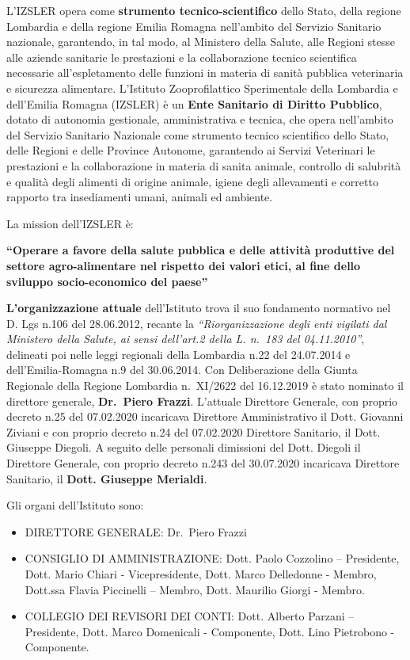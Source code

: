 \documentclass[
  12pt,
]{article}
\begin{document}
L'IZSLER opera come \textbf{strumento tecnico-scientifico} dello Stato,
della regione Lombardia e della regione Emilia Romagna nell'ambito del
Servizio Sanitario nazionale, garantendo, in tal modo, al Ministero
della Salute, alle Regioni stesse alle aziende sanitarie le prestazioni
e la collaborazione tecnico scientifica necessarie all'espletamento
delle funzioni in materia di sanità pubblica veterinaria e sicurezza
alimentare. L'Istituto Zooprofilattico Sperimentale della Lombardia e
dell'Emilia Romagna (IZSLER) è un \textbf{Ente Sanitario di Diritto
Pubblico}, dotato di autonomia gestionale, amministrativa e tecnica, che
opera nell'ambito del Servizio Sanitario Nazionale come strumento
tecnico scientifico dello Stato, delle Regioni e delle Province
Autonome, garantendo ai Servizi Veterinari le prestazioni e la
collaborazione in materia di sanita animale, controllo di salubrità e
qualità degli alimenti di origine animale, igiene degli allevamenti e
corretto rapporto tra insediamenti umani, animali ed ambiente.

La mission dell'IZSLER è:

\textbf{``Operare a favore della salute pubblica e delle attività
produttive del settore agro-alimentare nel rispetto dei valori etici, al
fine dello sviluppo socio-economico del paese''}

\textbf{L'organizzazione attuale} dell'Istituto trova il suo fondamento
normativo nel D. Lgs n.106 del 28.06.2012, recante la
\emph{``Riorganizzazione degli enti vigilati dal Ministero della Salute,
ai sensi dell'art.2 della L. n.~183 del 04.11.2010''}, delineati poi
nelle leggi regionali della Lombardia n.22 del 24.07.2014 e
dell'Emilia-Romagna n.9 del 30.06.2014. Con Deliberazione della Giunta
Regionale della Regione Lombardia n.~XI/2622 del 16.12.2019 è stato
nominato il direttore generale, \textbf{Dr.~Piero Frazzi}. L'attuale
Direttore Generale, con proprio decreto n.25 del 07.02.2020 incaricava
Direttore Amministrativo il Dott. Giovanni Ziviani e con proprio decreto
n.24 del 07.02.2020 Direttore Sanitario, il Dott. Giuseppe Diegoli. A
seguito delle personali dimissioni del Dott. Diegoli il Direttore
Generale, con proprio decreto n.243 del 30.07.2020 incaricava Direttore
Sanitario, il \textbf{Dott. Giuseppe Merialdi}.

Gli organi dell'Istituto sono:

\begin{itemize}
\item
  DIRETTORE GENERALE: Dr.~Piero Frazzi
\item
  CONSIGLIO DI AMMINISTRAZIONE: Dott. Paolo Cozzolino -- Presidente,
  Dott. Mario Chiari - Vicepresidente, Dott. Marco Delledonne - Membro,
  Dott.ssa Flavia Piccinelli -- Membro, Dott. Maurilio Giorgi - Membro.
\item
  COLLEGIO DEI REVISORI DEI CONTI: Dott. Alberto Parzani -- Presidente,
  Dott. Marco Domenicali - Componente, Dott. Lino Pietrobono -
  Componente.
\end{itemize}
\end{document}
